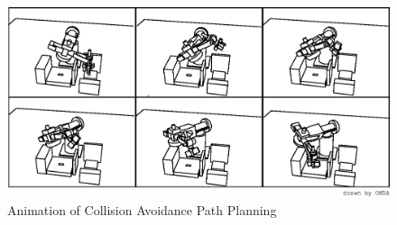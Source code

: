 \begin{figure}
\includegraphics[width=150mm]{fig/eta3colavo.ps}
\caption{Animation of Collision Avoidance Path Planning}
\end{figure}

%

\newpage

